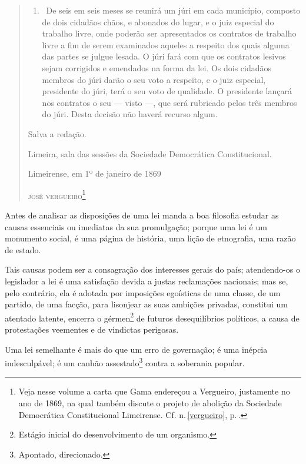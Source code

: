 {\begin{quote}
\begin{enumerate}[label=Art. \arabic*º]
\begin{enumerate}[label=§ \arabic*º]
\item\ De seis em seis meses se reunirá um júri em cada município,
composto de dois cidadãos chãos, e abonados do lugar, e o juiz especial
do trabalho livre, onde poderão ser apresentados os contratos de
trabalho livre a fim de serem examinados aqueles a respeito dos quais
alguma das partes se julgue lesada. O júri fará com que os contratos
lesivos sejam corrigidos e emendados na forma da lei. Os dois cidadãos
membros do júri darão o seu voto a respeito, e o juiz especial,
presidente do júri, terá o seu voto de qualidade. O presidente lançará
nos contratos o seu --- visto ---, que será rubricado pelos três
membros do júri. Desta decisão não haverá recurso algum.
\end{enumerate}
\end{enumerate}

Salva a redação.

Limeira, sala das sessões da Sociedade Democrática Constitucional.\medskip

\hfill{}Limeirense, em 1º de janeiro de 1869

\hfill\textsc{josé vergueiro}\footnote{Veja nesse volume a carta que Gama endereçou a
  Vergueiro, justamente no ano de 1869, na qual também discute o %
  projeto de abolição da Sociedade Democrática Constitucional
  Limeirense. Cf. n.\,\ref{vergueiro}, p.\,\pageref{vergueiro}.}
  \end{quote}

Antes de analisar as disposições de uma lei manda a boa filosofia
estudar as causas essenciais ou imediatas da sua promulgação; porque uma
lei é um monumento social, é uma página de história, uma lição de
etnografia, uma razão de estado.

Tais causas podem ser a consagração dos interesses gerais do país;
atendendo-os o legislador a lei é uma satisfação devida a justas
reclamações nacionais; mas se, pelo contrário, ela é adotada por
imposições egoísticas de uma classe, de um partido, de uma facção, para
lisonjear as suas ambições privadas, constitui um atentado latente,
encerra o gérmen\footnote{Estágio inicial do desenvolvimento de um
  organismo.} de futuros desequilíbrios políticos, a causa de
protestações veementes e de vindictas perigosas.

Uma lei semelhante é mais do que um erro de governação; é uma inépcia
indesculpável; é um canhão assestado\footnote{Apontado, direcionado.}
contra a soberania popular.

}
